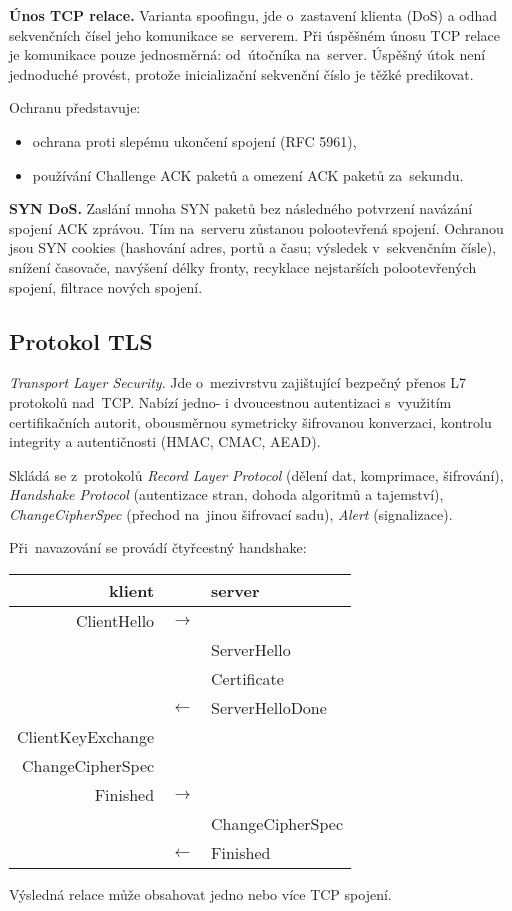 \textbf{Únos TCP relace.}
Varianta spoofingu, jde o~zastavení klienta (DoS) a odhad sekvenčních čísel jeho komunikace se~serverem.
Při úspěšném únosu TCP relace je komunikace pouze jednosměrná: od~útočníka na~server.
Úspěšný útok není jednoduché provést, protože inicializační sekvenční číslo je těžké predikovat. 

Ochranu představuje:
\vspace*{-0.5em}\begin{itemize}
    \item ochrana proti slepému ukončení spojení (RFC 5961),
    \item používání Challenge ACK paketů a omezení ACK paketů za~sekundu.
\end{itemize}

\textbf{SYN DoS.}
Zaslání mnoha SYN paketů bez následného potvrzení navázání spojení ACK zprávou.
Tím na~serveru zůstanou polootevřená spojení.
Ochranou jsou SYN cookies (hashování adres, portů a času; výsledek v~sekvenčním čísle), snížení časovače, navýšení délky fronty, recyklace nejstarších polootevřených spojení, filtrace nových spojení.


\vfill
\subsection{Protokol TLS}

\emph{Transport Layer Security}.
Jde o~mezivrstvu zajištující bezpečný přenos L7 protokolů nad~TCP.
Nabízí jedno- i dvoucestnou autentizaci s~využitím certifikačních autorit, obousměrnou symetricky šifrovanou konverzaci, kontrolu integrity a autentičnosti (HMAC, CMAC, AEAD).

Skládá se z~protokolů \emph{Record Layer Protocol} (dělení dat, komprimace, šifrování), \emph{Handshake Protocol} (autentizace stran, dohoda algoritmů a tajemství), \emph{ChangeCipherSpec} (přechod na~jinou šifrovací sadu), \emph{Alert} (signalizace).

Při~navazování se provádí čtyřcestný handshake:
\begin{center}
\begin{tabular}{rcl}
	klient & & server \\
	\hline
	ClientHello & $\rightarrow$ & \\
	& & ServerHello \\
	& & Certificate \\
	& $\leftarrow$ & ServerHelloDone \\
	ClientKeyExchange & & \\
	ChangeCipherSpec & & \\
	Finished & $\rightarrow$ & \\
	& & ChangeCipherSpec \\
	& $\leftarrow$ & Finished \\
\end{tabular}
\end{center}
Výsledná relace může obsahovat jedno nebo více TCP spojení.

